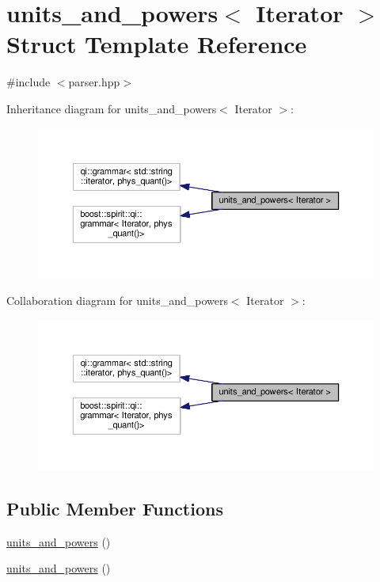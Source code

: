 \hypertarget{structunits__and__powers}{}\section{units\+\_\+and\+\_\+powers$<$ Iterator $>$ Struct Template Reference}
\label{structunits__and__powers}


{\ttfamily \#include $<$parser.\+hpp$>$}



Inheritance diagram for units\+\_\+and\+\_\+powers$<$ Iterator $>$\+:\nopagebreak
\begin{figure}[H]
\begin{center}
\leavevmode
\includegraphics[width=350pt]{structunits__and__powers__inherit__graph}
\end{center}
\end{figure}


Collaboration diagram for units\+\_\+and\+\_\+powers$<$ Iterator $>$\+:\nopagebreak
\begin{figure}[H]
\begin{center}
\leavevmode
\includegraphics[width=350pt]{structunits__and__powers__coll__graph}
\end{center}
\end{figure}
\subsection*{Public Member Functions}
\begin{DoxyCompactItemize}
\item 
\hyperlink{structunits__and__powers_abf55b2bb4c8700587a41023424ae31cf}{units\+\_\+and\+\_\+powers} ()
\item 
\hyperlink{structunits__and__powers_abf55b2bb4c8700587a41023424ae31cf}{units\+\_\+and\+\_\+powers} ()
\end{DoxyCompactItemize}
